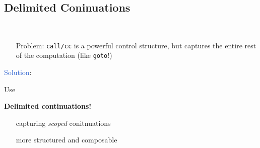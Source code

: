 \subsection{Delimited Coninuations}
\begin{frame}[fragile]
	\frametitlesubs

	\begin{minipage}{.09\textwidth}
		\
	\end{minipage}
	\begin{minipage}{.9\textwidth}
		\begin{itemize}
			\item[\textcolor{subhighlight}{Problem}:]
			      \texttt{call/cc} is a powerful control structure, but captures the entire rest of the computation (like \texttt{goto}!)

		\end{itemize}
	\end{minipage}

	\pause
	\vspace{1\zh}
	\hspace{.2\zw}\textcolor{highlight}{Solution}:

	\hspace{.3\zw}
	\begin{minipage}[t]{.60\textwidth}
		\vspace{.2\zh}
		\centering
		{\Large{}Use}

		\textbf{\large{}Delimited continuations!}\cite{felleisen1988prompt}

		\begin{itemize}
			\item[\emoji{check-mark-button}] capturing \textit{scoped} conitnuations
			\item[\emoji{check-mark-button}] more structured and composable
		\end{itemize}


\end{minipage}
\end{frame}
